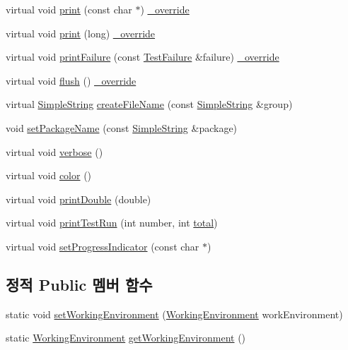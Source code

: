 \begin{DoxyCompactItemize}
virtual void \hyperlink{class_j_unit_test_output_a7d4ba34686dd9d50f4fd01c0b80d4fa7}{print} (const char $\ast$) \hyperlink{_cpp_u_test_config_8h_a049bea15dd750e15869863c94c1efc3b}{\+\_\+override}
\item 
virtual void \hyperlink{class_j_unit_test_output_a57b529089ba9e0c077bf85c805560b98}{print} (long) \hyperlink{_cpp_u_test_config_8h_a049bea15dd750e15869863c94c1efc3b}{\+\_\+override}
\item 
virtual void \hyperlink{class_j_unit_test_output_a5c917b949750083f7774dbcf412cfbc5}{print\+Failure} (const \hyperlink{class_test_failure}{Test\+Failure} \&failure) \hyperlink{_cpp_u_test_config_8h_a049bea15dd750e15869863c94c1efc3b}{\+\_\+override}
\item 
virtual void \hyperlink{class_j_unit_test_output_a9fde218af86a81b79f82b86f3ddeabe5}{flush} () \hyperlink{_cpp_u_test_config_8h_a049bea15dd750e15869863c94c1efc3b}{\+\_\+override}
\item 
virtual \hyperlink{class_simple_string}{Simple\+String} \hyperlink{class_j_unit_test_output_abab9bdc64bf72ab45cfe40000aa0602f}{create\+File\+Name} (const \hyperlink{class_simple_string}{Simple\+String} \&group)
\item 
void \hyperlink{class_j_unit_test_output_a146d868bda2dda4264d6281db8c9ab21}{set\+Package\+Name} (const \hyperlink{class_simple_string}{Simple\+String} \&package)
\item 
virtual void \hyperlink{class_test_output_a2ae0a8d48809abb33b5ba47c56fdc3ad}{verbose} ()
\item 
virtual void \hyperlink{class_test_output_ae8d23f2d3de1d9d47d8139d54fb89640}{color} ()
\item 
virtual void \hyperlink{class_test_output_a0ed13c187762336a2bf0fd89687b014a}{print\+Double} (double)
\item 
virtual void \hyperlink{class_test_output_a0cffc4628d21b0cd25649f9084927ca9}{print\+Test\+Run} (int number, int \hyperlink{test__intervals_8c_ac7af894858cf396a219d632f40afdc8d}{total})
\item 
virtual void \hyperlink{class_test_output_a97c09fc275d40b7ec559aaa91843cdcd}{set\+Progress\+Indicator} (const char $\ast$)
\end{DoxyCompactItemize}
\subsection*{정적 Public 멤버 함수}
\begin{DoxyCompactItemize}
\item 
static void \hyperlink{class_test_output_a25907ddd60d8454ca78f81edef6c77c3}{set\+Working\+Environment} (\hyperlink{class_test_output_a0541851f863713454486a9fb3080f766}{Working\+Environment} work\+Environment)
\item 
static \hyperlink{class_test_output_a0541851f863713454486a9fb3080f766}{Working\+Environment} \hyperlink{class_test_output_a90d5028d0f7f6f41ca2dced042a8709d}{get\+Working\+Environment} ()
\end{DoxyCompactItemize}
